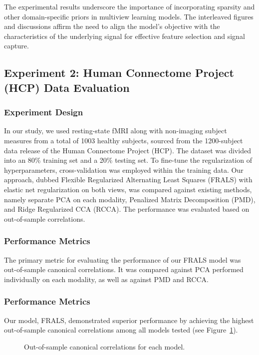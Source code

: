The experimental results underscore the importance of incorporating sparsity and other domain-specific priors in multiview learning models.
The interleaved figures and discussions affirm the need to align the model's objective with the characteristics of the underlying signal for effective feature selection and signal capture.




\subsection{Experiment 2: Human Connectome Project (HCP) Data Evaluation}

\subsubsection{Experiment Design}
In our study, we used resting-state fMRI along with non-imaging subject measures from a total of 1003 healthy subjects, sourced from the 1200-subject data release of the Human Connectome Project (HCP). The dataset was divided into an 80\% training set and a 20\% testing set.
To fine-tune the regularization of hyperparameters, cross-validation was employed within the training data.
Our approach, dubbed Flexible Regularized Alternating Least Squares (FRALS) with elastic net regularization on both views, was compared against existing methods, namely separate PCA on each modality, Penalized Matrix Decomposition (PMD), and Ridge Regularized CCA (RCCA). The performance was evaluated based on out-of-sample correlations.

\subsubsection{Performance Metrics}
The primary metric for evaluating the performance of our FRALS model was out-of-sample canonical correlations.
It was compared against PCA performed individually on each modality, as well as against PMD and RCCA\@.

\subsubsection{Performance Metrics}
Our model, FRALS, demonstrated superior performance by achieving the highest out-of-sample canonical correlations among all models tested (see Figure~\ref{fig:performance}).

\begin{figure}[h]
\centering

\caption{Out-of-sample canonical correlations for each model.}
\label{fig:performance}
\end{figure}

